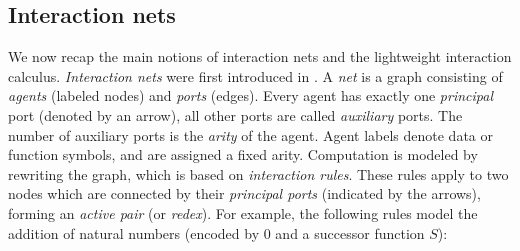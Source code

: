 \documentclass[submission,copyright,creativecommons]{eptcs}
\begin{document}
\subsection{Interaction nets}
\label{sec:interaction_nets}
We now recap the main notions of interaction nets and the
lightweight interaction calculus. \emph{Interaction nets} were first introduced in
\cite{lafont_interaction_1990}.
A \emph{net} is a graph consisting of \emph{agents} (labeled nodes) and
\emph{ports} (edges). Every agent has exactly one \emph{principal} port
(denoted by an arrow), all other ports are called \emph{auxiliary} ports. The
number of auxiliary ports is the \emph{arity} of the agent. Agent labels
denote data or function symbols, and are assigned a fixed arity. Computation is
modeled by rewriting the graph, which is based on \emph{interaction rules}.
These rules apply to two
nodes which are connected by
their \emph{principal ports}
(indicated by the arrows), forming an \emph{active pair} (or \emph{redex}).
For example, the following
rules model the addition of natural numbers (encoded by 0 and a successor function $S$):
\end{document}
